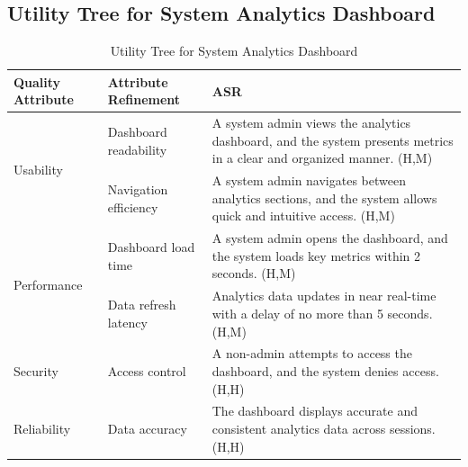 \documentclass{article}
\begin{document}
\subsection{Utility Tree for System Analytics Dashboard}

\begin{table}[H]
    \centering
    \caption{Utility Tree for System Analytics Dashboard}
    \begin{tabular}{|p{3cm}|p{4cm}|p{7cm}|}
        \hline
        \textbf{Quality Attribute} & \textbf{Attribute Refinement}                                                                                        & \textbf{ASR} \\
        \hline

        \multirow{2}{*}{Usability}
                                   & Dashboard readability
                                   & A system admin views the analytics dashboard, and the system presents metrics in a clear and organized manner. (H,M)                \\
        \cline{2-3}
                                   & Navigation efficiency
                                   & A system admin navigates between analytics sections, and the system allows quick and intuitive access. (H,M)                        \\
        \hline

        \multirow{2}{*}{Performance}
                                   & Dashboard load time
                                   & A system admin opens the dashboard, and the system loads key metrics within 2 seconds. (H,M)                                        \\
        \cline{2-3}
                                   & Data refresh latency
                                   & Analytics data updates in near real-time with a delay of no more than 5 seconds. (H,M)                                              \\
        \hline

        Security
                                   & Access control
                                   & A non-admin attempts to access the dashboard, and the system denies access. (H,H)                                                   \\
        \hline

        Reliability
                                   & Data accuracy
                                   & The dashboard displays accurate and consistent analytics data across sessions. (H,H)                                                \\
        \hline


\end{tabular}
\end{table}
\end{document}
